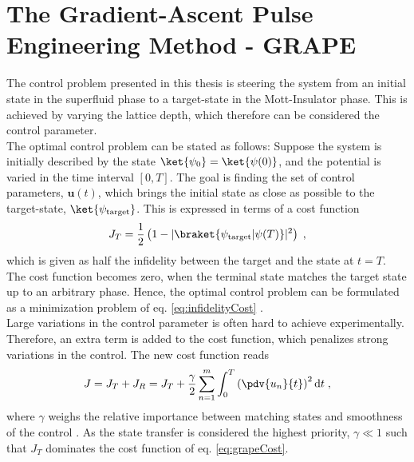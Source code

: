 \section{The Gradient-Ascent Pulse Engineering Method - GRAPE} \label{sec:GRAPE}
The control problem presented in this thesis is steering the system from an initial state in the superfluid phase to a target-state in the Mott-Insulator phase. This is achieved by varying the lattice depth, which therefore can be considered the control parameter.\\
The optimal control problem can be stated as follows: 
Suppose the system is initially described by the state $\ket{\psi_0} = \ket{\psi (0)}$, and the potential is varied in the time interval $[ 0 , T]$. The goal is finding the set of control parameters, $\boldsymbol{u}(t)$, which brings the initial state as close as possible to the target-state, $\ket{\psi_{\mathrm{target}}}$. This is expressed in terms of a cost function
\begin{equation}
	J_T = \frac{1}{2} \left( 1-|\braket{\psi_{\mathrm{target}} | \psi (T)}|^2 \right) \; ,
	\label{eq:infidelityCost}
\end{equation}
which is given as half the infidelity between the target and the state at $t=T$. The cost function becomes zero, when the terminal state matches the target state up to an arbitrary phase. Hence, the optimal control problem can be formulated as a minimization problem of eq. \eqref{eq:infidelityCost} \cite{Jager2014}.\\
Large variations in the control parameter is often hard to achieve experimentally. Therefore, an extra term is added to the cost function, which penalizes strong variations in the control. The new cost function reads
\begin{equation}
	J = J_T + J_R = J_T + \frac{\gamma}{2} \sum_{n=1}^{m} \int_{0}^{T} \left( \pdv{u_n}{t} \right)^2 \mathrm{d}t \; ,
	\label{eq:grapeCost}
\end{equation}
where $\gamma$ weighs the relative importance between matching states and smoothness of the control \cite{Jager2014}. As the state transfer is considered the highest priority, $\gamma \ll 1$ such that $J_T$ dominates the cost function of eq. \eqref{eq:grapeCost}.\\

